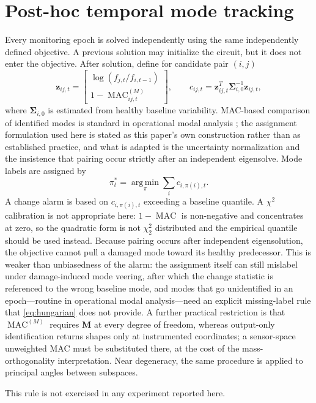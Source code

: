 \documentclass[journal]{IEEEtran}
\newcommand{\M}{\mathbf{M}}
\newcommand{\MAC}{\operatorname{MAC}}
\newcommand{\argmin}{\operatorname*{arg\,min}}
\begin{document}
\section{Post-hoc temporal mode tracking}
\label{app:tracking}
Every monitoring epoch is solved independently using the same independently defined objective. A previous solution may initialize the circuit, but it does not enter the objective. After solution, define for candidate pair $(i,j)$
\begin{equation}
\mathbf z_{ij,t}=
\begin{bmatrix}
\log(f_{j,t}/f_{i,t-1})\\
1-\MAC_{ij,t}^{(M)}
\end{bmatrix},
\qquad
c_{ij,t}=\mathbf z_{ij,t}^T\boldsymbol\Sigma_{i,0}^{-1}\mathbf z_{ij,t},
\label{eq:trackingcost}
\end{equation}
where $\boldsymbol\Sigma_{i,0}$ is estimated from healthy baseline variability. MAC-based comparison of identified modes is standard in operational modal analysis \cite{Reynders2012}; the assignment formulation used here is stated as this paper's own construction rather than as established practice, and what is adapted is the uncertainty normalization and the insistence that pairing occur strictly after an independent eigensolve. Mode labels are assigned by
\begin{equation}
\pi_t^*=\argmin_{\pi}\sum_i c_{i,\pi(i),t}.
\label{eq:hungarian}
\end{equation}
A change alarm is based on $c_{i,\pi(i),t}$ exceeding a baseline quantile. A $\chi^2$ calibration is not appropriate here: $1-\MAC$ is non-negative and concentrates at zero, so the quadratic form is not $\chi^2_2$ distributed and the empirical quantile should be used instead. Because pairing occurs after independent eigensolution, the objective cannot pull a damaged mode toward its healthy predecessor. This is weaker than unbiasedness of the alarm: the assignment itself can still mislabel under damage-induced mode veering, after which the change statistic is referenced to the wrong baseline mode, and modes that go unidentified in an epoch---routine in operational modal analysis---need an explicit missing-label rule that \cref{eq:hungarian} does not provide. A further practical restriction is that $\MAC^{(M)}$ requires $\M$ at every degree of freedom, whereas output-only identification returns shapes only at instrumented coordinates; a sensor-space unweighted MAC must be substituted there, at the cost of the mass-orthogonality interpretation. Near degeneracy, the same procedure is applied to principal angles between subspaces.

This rule is not exercised in any experiment reported here.



\end{document}
